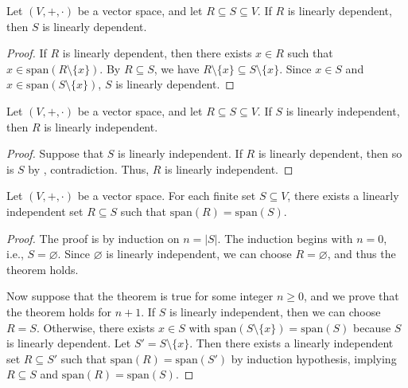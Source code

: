 \begin{theorem}\label{thm:linear-independence-implication}
  Let $(V, +, \cdot)$ be a vector space, and let $R \subseteq S \subseteq V$.
  If $R$ is linearly dependent, then $S$ is linearly dependent.
\end{theorem}
\begin{proof}
  If $R$ is linearly dependent, then there exists $x \in R$ such that
  $x \in \mathrm{span}(R \setminus \{x\})$.
  By $R \subseteq S$, we have
  $R \setminus \{x\} \subseteq S \setminus \{x\}$.
  Since $x \in S$ and $x \in \mathrm{span}(S \setminus \{x\})$, $S$ is
  linearly dependent.
\end{proof}

\begin{corollary}
  Let $(V, +, \cdot)$ be a vector space, and let $R \subseteq S \subseteq V$.
  If $S$ is linearly independent, then $R$ is linearly independent.
\end{corollary}
\begin{proof}
  Suppose that $S$ is linearly independent.
  If $R$ is linearly dependent, then so is $S$ by
  , contradiction.
  Thus, $R$ is linearly independent.
\end{proof}

\begin{theorem}\label{thm:linearly-independent-subset}
  Let $(V, +, \cdot)$ be a vector space.
  For each finite set $S \subseteq V$, there exists a linearly independent
  set $R \subseteq S$ such that $\mathrm{span}(R) = \mathrm{span}(S)$.
\end{theorem}
\begin{proof}
  The proof is by induction on $n = |S|$.
  The induction begins with $n = 0$, i.e., $S = \varnothing$.
  Since $\varnothing$ is linearly independent, we can choose
  $R = \varnothing$, and thus the theorem holds.

  Now suppose that the theorem is true for some integer $n \geq 0$,
  and we prove that the theorem holds for $n + 1$.
  If $S$ is linearly independent, then we can choose $R = S$.
  Otherwise, there exists $x \in S$
  with $\mathrm{span}(S \setminus \{x\}) = \mathrm{span}(S)$ because
  $S$ is linearly dependent.
  Let $S' = S \setminus \{x\}$. Then there exists a linearly independent set
  $R \subseteq S'$ such that $\mathrm{span}(R) = \mathrm{span}(S')$ by
  induction hypothesis, implying
  $R \subseteq S$ and $\mathrm{span}(R) = \mathrm{span}(S)$.
\end{proof}

